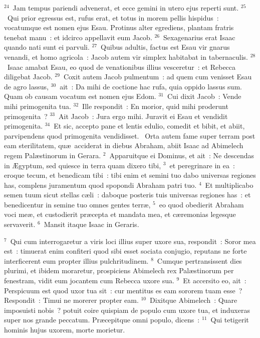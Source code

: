 ${}^{24}$~Jam tempus pariendi advenerat, et ecce gemini in utero ejus reperti sunt.
${}^{25}$~Qui prior egressus est, rufus erat, et totus in morem pellis hispidus~: vocatumque est nomen ejus Esau. Protinus alter egrediens, plantam fratris tenebat manu~: et idcirco appellavit eum Jacob.
${}^{26}$~Sexagenarius erat Isaac quando nati sunt ei parvuli.
${}^{27}$~Quibus adultis, factus est Esau vir gnarus venandi, et homo agricola~: Jacob autem vir simplex habitabat in tabernaculis.
${}^{28}$~Isaac amabat Esau, eo quod de venationibus illius vesceretur~: et Rebecca diligebat Jacob.
${}^{29}$~Coxit autem Jacob pulmentum~: ad quem cum venisset Esau de agro lassus,
${}^{30}$~ait~: Da mihi de coctione hac rufa, quia oppido lassus sum. Quam ob causam vocatum est nomen ejus Edom.
${}^{31}$~Cui dixit Jacob~: Vende mihi primogenita tua.
${}^{32}$~Ille respondit~: En morior, quid mihi proderunt primogenita~?
${}^{33}$~Ait Jacob~: Jura ergo mihi. Juravit ei Esau et vendidit primogenita.
${}^{34}$~Et sic, accepto pane et lentis edulio, comedit et bibit, et abiit, parvipendens quod primogenita vendidisset.
~Orta autem fame super terram post eam sterilitatem, qu\ae\ acciderat in diebus Abraham, abiit Isaac ad Abimelech regem Pal\ae stinorum in Gerara.
${}^{2}$~Apparuitque ei Dominus, et ait~: Ne descendas in \AE gyptum, sed quiesce in terra quam dixero tibi,
${}^{3}$~et peregrinare in ea~: eroque tecum, et benedicam tibi~: tibi enim et semini tuo dabo universas regiones has, complens juramentum quod spopondi Abraham patri tuo.
${}^{4}$~Et multiplicabo semen tuum sicut stellas c\ae li~: daboque posteris tuis universas regiones has~: et benedicentur in semine tuo omnes gentes terr\ae ,
${}^{5}$~eo quod obedierit Abraham voci me\ae , et custodierit pr\ae cepta et mandata mea, et c\ae remonias legesque servaverit.
${}^{6}$~Mansit itaque Isaac in Geraris.


${}^{7}$~Qui cum interrogaretur a viris loci illius super uxore sua, respondit~: Soror mea est~: timuerat enim confiteri quod sibi esset sociata conjugio, reputans ne forte interficerent eum propter illius pulchritudinem.
${}^{8}$~Cumque pertransissent dies plurimi, et ibidem moraretur, prospiciens Abimelech rex Pal\ae stinorum per fenestram, vidit eum jocantem cum Rebecca uxore sua.
${}^{9}$~Et accersito eo, ait~: Perspicuum est quod uxor tua sit~: cur mentitus es eam sororem tuam esse~? Respondit~: Timui ne morerer propter eam.
${}^{10}$~Dixitque Abimelech~: Quare imposuisti nobis~? potuit coire quispiam de populo cum uxore tua, et induxeras super nos grande peccatum. Pr\ae cepitque omni populo, dicens~:
${}^{11}$~Qui tetigerit hominis hujus uxorem, morte morietur.


